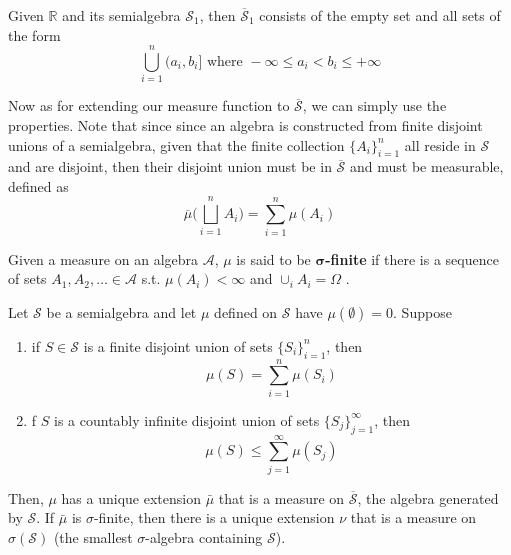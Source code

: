 \documentclass{article}
\begin{document}
    \begin{example}
      Given $\mathbb{R}$ and its semialgebra $\mathcal{S}_1$, then $\overline{\mathcal{S}}_1$ consists of the empty set and all sets of the form 
      \begin{equation}
        \bigcup_{i=1}^n (a_i, b_i] \text{ where } -\infty \leq a_i < b_i \leq +\infty
      \end{equation}
    \end{example}

    Now as for extending our measure function to $\overline{\mathcal{S}}$, we can simply use the properties. Note that since since an algebra is constructed from finite disjoint unions of a semialgebra, given that the finite collection $\{A_i\}_{i=1}^n$ all reside in $\mathcal{S}$ and are disjoint, then their disjoint union must be in $\overline{\mathcal{S}}$ and must be measurable, defined as 
    \begin{equation}
      \overline{\mu} \bigg( \bigsqcup_{i=1}^n A_i \bigg) = \sum_{i=1}^n \mu(A_i)
    \end{equation}

    \begin{definition}
      Given a measure on an algebra $\mathcal{A}$, $\mu$ is said to be \textbf{$\boldsymbol{\sigma}$-finite} if there is a sequence of sets $A_1, A_2, \ldots \in \mathcal{A}$ s.t. $\mu(A_i) < \infty$ and $\cup_i A_i = \Omega$ . 
    \end{definition}

    \begin{theorem}
      Let $\mathcal{S}$ be a semialgebra and let $\mu$ defined on $\mathcal{S}$ have $\mu(\emptyset) = 0$. Suppose 
      \begin{enumerate}
        \item if $S \in \mathcal{S}$ is a finite disjoint union of sets $\{S_i\}_{i=1}^n$, then 
        \begin{equation}
          \mu(S) = \sum_{i=1}^n \mu(S_i)
        \end{equation}
        \item f $S$ is a countably infinite disjoint union of sets $\{S_j\}_{j=1}^\infty$, then 
        \begin{equation}
          \mu(S) \leq \sum_{j=1}^\infty \mu(S_j)
        \end{equation}
      \end{enumerate}
      Then, $\mu$ has a unique extension $\bar{\mu}$ that is a measure on $\overline{\mathcal{S}}$, the algebra generated by $\mathcal{S}$. If $\bar{\mu}$ is $\sigma$-finite, then there is a unique extension $\nu$ that is a measure on $\sigma(\mathcal{S})$ (the smallest $\sigma$-algebra containing $\mathcal{S}$). 
    \end{theorem}
\end{document}
